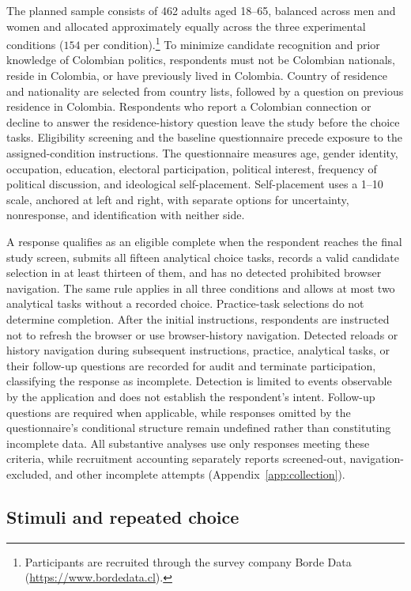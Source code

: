 \documentclass[11pt]{article}\usepackage[]{graphicx}\usepackage[]{xcolor}
\begin{document}
The planned sample consists of 462 adults aged 18--65, balanced across men and women and allocated approximately equally across the three experimental conditions ($154$ per condition).\footnote{Participants are recruited through the survey company Borde Data (\url{https://www.bordedata.cl}).} To minimize candidate recognition and prior knowledge of Colombian politics, respondents must not be Colombian nationals, reside in Colombia, or have previously lived in Colombia. Country of residence and nationality are selected from country lists, followed by a question on previous residence in Colombia. Respondents who report a Colombian connection or decline to answer the residence-history question leave the study before the choice tasks. Eligibility screening and the baseline questionnaire precede exposure to the assigned-condition instructions. The questionnaire measures age, gender identity, occupation, education, electoral participation, political interest, frequency of political discussion, and ideological self-placement. Self-placement uses a 1--10 scale, anchored at left and right, with separate options for uncertainty, nonresponse, and identification with neither side.

A response qualifies as an eligible complete when the respondent reaches the final study screen, submits all fifteen analytical choice tasks, records a valid candidate selection in at least thirteen of them, and has no detected prohibited browser navigation. The same rule applies in all three conditions and allows at most two analytical tasks without a recorded choice. Practice-task selections do not determine completion. After the initial instructions, respondents are instructed not to refresh the browser or use browser-history navigation. Detected reloads or history navigation during subsequent instructions, practice, analytical tasks, or their follow-up questions are recorded for audit and terminate participation, classifying the response as incomplete. Detection is limited to events observable by the application and does not establish the respondent's intent. Follow-up questions are required when applicable, while responses omitted by the questionnaire's conditional structure remain undefined rather than constituting incomplete data. All substantive analyses use only responses meeting these criteria, while recruitment accounting separately reports screened-out, navigation-excluded, and other incomplete attempts (Appendix~\ref{app:collection}).

\subsection{Stimuli and repeated choice}
\end{document}
